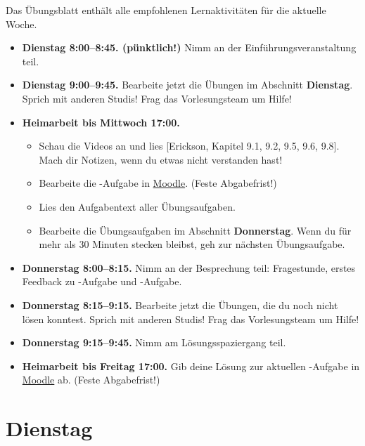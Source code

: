 \documentclass{uebung_cs}
\begin{document}
Das Übungsblatt enthält alle empfohlenen Lernaktivitäten für die aktuelle Woche.

\begin{itemize}
\item \textbf{Dienstag 8:00--8:45.  (pünktlich!)} Nimm an der Einführungsveranstaltung teil.
\item \textbf{Dienstag 9:00--9:45.} Bearbeite jetzt die Übungen im Abschnitt \textbf{Dienstag}. Sprich mit anderen Studis! Frag das Vorlesungsteam um Hilfe!
\item \textbf{Heimarbeit bis Mittwoch 17:00.}
\begin{itemize}
\item 
Schau die Videos an und lies [Erickson, Kapitel 9.1, 9.2, 9.5, 9.6, 9.8]. Mach dir Notizen, wenn du etwas nicht verstanden hast!
\item Bearbeite die -Aufgabe in \href{https://moodle.studiumdigitale.uni-frankfurt.de/moodle/course/view.php?id=2241}{Moodle}. (Feste Abgabefrist!)
\item Lies den Aufgabentext aller Übungsaufgaben.
\item Bearbeite die Übungsaufgaben im Abschnitt \textbf{Donnerstag}. Wenn du für mehr als 30 Minuten stecken bleibst, geh zur nächsten Übungsaufgabe.
\end{itemize}
\item \textbf{Donnerstag 8:00--8:15.} Nimm an der Besprechung teil: Fragestunde, erstes Feedback zu -Aufgabe und -Aufgabe.
\item \textbf{Donnerstag 8:15--9:15.} Bearbeite jetzt die Übungen, die du noch nicht lösen konntest. Sprich mit anderen Studis! Frag das Vorlesungsteam um Hilfe!
\item \textbf{Donnerstag 9:15--9:45.} Nimm am Lösungsspaziergang teil.
\item \textbf{Heimarbeit bis Freitag 17:00.} Gib deine Lösung zur aktuellen -Aufgabe in \href{https://moodle.studiumdigitale.uni-frankfurt.de/moodle/course/view.php?id=2241}{Moodle} ab. (Feste Abgabefrist!)
\end{itemize}

\section*{Dienstag}
\end{document}
